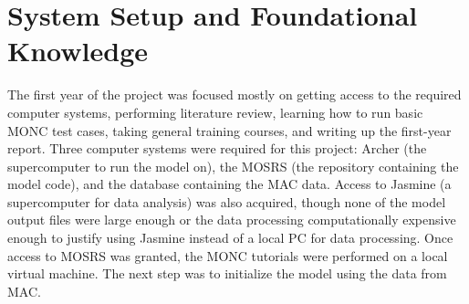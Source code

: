 \section{System Setup and Foundational Knowledge} \label{ch:reality}
The first year of the project was focused mostly on getting access to the required computer systems, performing literature review, learning how to run basic MONC test cases, taking general training courses, and writing up the first-year report. Three computer systems were required for this project: Archer (the supercomputer to run the model on), the MOSRS (the repository containing the model code), and the database containing the MAC data. Access to Jasmine (a supercomputer for data analysis) was also acquired, though none of the model output files were large enough or the data processing computationally expensive enough to justify using Jasmine instead of a local PC for data processing. Once access to MOSRS was granted, the MONC tutorials were performed on a local virtual machine. The next step was to initialize the model using the data from MAC. 

